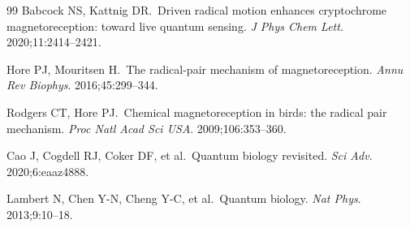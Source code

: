 \documentclass[11pt]{article}
\begin{document}
\begin{thebibliography}{99}
Babcock NS, Kattnig DR.\ Driven radical motion enhances cryptochrome magnetoreception: toward 
live quantum sensing. \textit{J Phys Chem Lett}. 2020;11:2414--2421.

Hore PJ, Mouritsen H.\ The radical-pair mechanism of magnetoreception. 
\textit{Annu Rev Biophys}. 2016;45:299--344.

Rodgers CT, Hore PJ.\ Chemical magnetoreception in birds: the radical pair mechanism. 
\textit{Proc Natl Acad Sci USA}. 2009;106:353--360.

Cao J, Cogdell RJ, Coker DF, et al.\ Quantum biology revisited. \textit{Sci Adv}. 
2020;6:eaaz4888.

Lambert N, Chen Y-N, Cheng Y-C, et al.\ Quantum biology. \textit{Nat Phys}. 
2013;9:10--18.

\end{thebibliography}
\end{document}
